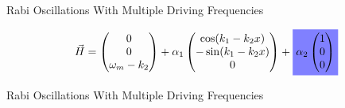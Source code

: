 \documentclass[9pt]{beamer}
\begin{document}
\begin{darkframes}
\begin{frame}{Rabi Oscillations With Multiple Driving Frequencies}
{\begin{equation*}
    \vec H = \begin{pmatrix}
    0\\
    0\\
    \omega_m - k_2
    \end{pmatrix} + \alpha_1\begin{pmatrix}
     \cos(k_1-k_2x)\\
    -\sin(k_1-k_2x)\\
    0
\end{pmatrix} + \colorbox{blue!50}{$\alpha_2\begin{pmatrix}
    1\\
    0\\
    0
    \end{pmatrix}$}
\end{equation*}

}



\end{frame}


\begin{frame}{Rabi Oscillations With Multiple Driving Frequencies}


\end{frame}
\end{darkframes}
\end{document}
